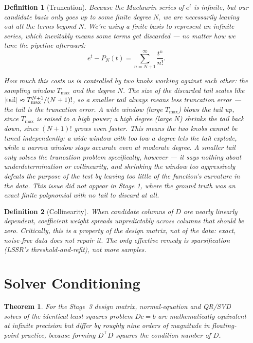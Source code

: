 \documentclass[11pt]{article}
\newtheorem{theorem}{Theorem}
\newtheorem{definition}{Definition}
\begin{document}
\begin{definition}[Truncation]
Because the Maclaurin series of $e^t$ is infinite, but our candidate basis only goes up
to some finite degree $N$, we are necessarily leaving out all the terms beyond $N$. We're
using a finite basis to represent an infinite series, which inevitably means some terms
get discarded --- no matter how we tune the pipeline afterward:
\[
e^{t} - P_N(t) = \sum_{n=N+1}^{\infty} \frac{t^n}{n!}.
\]

How much this costs us is controlled by two knobs working against each other: the
sampling window $T_{\max}$ and the degree $N$. The size of the discarded tail scales
like $|{\rm tail}| \approx T_{\max}^{N+1}/(N+1)!$, so a smaller tail always means less
truncation error --- the tail is the truncation error. A wide window (large
$T_{\max}$) blows the tail up, since $T_{\max}$ is raised to a high power; a high degree
(large $N$) shrinks the tail back down, since $(N+1)!$ grows even faster. This means the
two knobs cannot be tuned independently: a wide window with too low a degree lets the
tail explode, while a narrow window stays accurate even at moderate degree. A smaller
tail only solves the truncation problem specifically, however --- it says nothing about
underdetermination or collinearity, and shrinking the window too aggressively defeats
the purpose of the test by leaving too little of the function's curvature in the data.
This issue did not appear in Stage 1, where the ground truth was an exact finite
polynomial with no tail to discard at all.


\end{definition}

\begin{definition}[Collinearity]
When candidate columns of $D$ are nearly linearly dependent, coefficient weight spreads
unpredictably across columns that should be zero. Critically, this is a property of the
\emph{design matrix}, not of the data: exact, noise-free data does not repair it. The
only effective remedy is sparsification (LSSR's threshold-and-refit), not more samples.
\end{definition}

\section{Solver Conditioning}
\begin{theorem}
For the Stage~3 design matrix, normal-equation and QR/SVD solves of the identical
least-squares problem $Dc=b$ are mathematically equivalent at infinite precision but
differ by roughly nine orders of magnitude in floating-point practice, because forming
$D^{\top}D$ squares the condition number of $D$.
\end{theorem}
\end{document}
